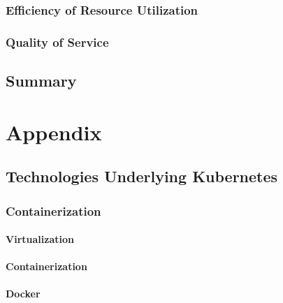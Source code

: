 \documentclass[twoside]{report}
\begin{document}
\subsection{Efficiency of Resource Utilization}

\subsection{Quality of Service}

\section{Summary}

\chapter{Appendix}

\section{Technologies Underlying Kubernetes}

\subsection{Containerization}

\subsubsection{Virtualization}

\subsubsection{Containerization}

\subsubsection{Docker}



\end{document}
